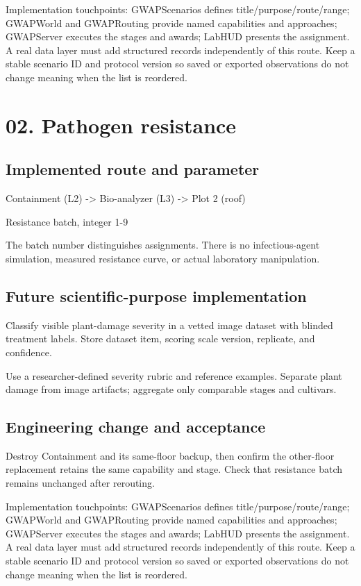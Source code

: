 Implementation touchpoints: GWAPScenarios defines title/\allowbreak{}purpose/\allowbreak{}route/\allowbreak{}range; GWAPWorld and GWAPRouting provide named capabilities and approaches; GWAPServer executes the stages and awards; LabHUD presents the assignment.\allowbreak{} A real data layer must add structured records independently of this route.\allowbreak{} Keep a stable scenario ID and protocol version so saved or exported observations do not change meaning when the list is reordered.\allowbreak{}

\section{02.\allowbreak{} Pathogen resistance}
\subsection{Implemented route and parameter}
Containment (L2) -> Bio-analyzer (L3) -> Plot 2 (roof)

Resistance batch, integer 1-9

The batch number distinguishes assignments.\allowbreak{} There is no infectious-agent simulation, measured resistance curve, or actual laboratory manipulation.\allowbreak{}

\subsection{Future scientific-purpose implementation}
Classify visible plant-damage severity in a vetted image dataset with blinded treatment labels.\allowbreak{} Store dataset item, scoring scale version, replicate, and confidence.\allowbreak{}

Use a researcher-defined severity rubric and reference examples.\allowbreak{} Separate plant damage from image artifacts; aggregate only comparable stages and cultivars.\allowbreak{}

\subsection{Engineering change and acceptance}
Destroy Containment and its same-floor backup, then confirm the other-floor replacement retains the same capability and stage.\allowbreak{} Check that resistance batch remains unchanged after rerouting.\allowbreak{}

Implementation touchpoints: GWAPScenarios defines title/\allowbreak{}purpose/\allowbreak{}route/\allowbreak{}range; GWAPWorld and GWAPRouting provide named capabilities and approaches; GWAPServer executes the stages and awards; LabHUD presents the assignment.\allowbreak{} A real data layer must add structured records independently of this route.\allowbreak{} Keep a stable scenario ID and protocol version so saved or exported observations do not change meaning when the list is reordered.\allowbreak{}

